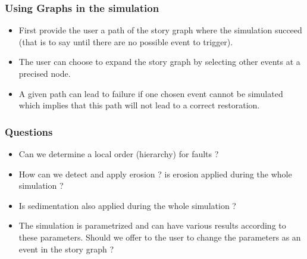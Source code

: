 \documentclass{beamer}
\begin{document}
    \begin{frame}
    \frametitle{Using Graphs in the simulation}
    \begin{itemize}
    \item First provide the user a path of the story graph where the simulation succeed (that is to say until there are no possible event to trigger).
    \item The user can choose to expand the story graph by selecting other events at a precised node. 
    \item A given path can lead to failure if one chosen event cannot be simulated which implies that this path will not lead to a correct restoration.
    \end{itemize}
	\end{frame}
	
	\begin{frame}
	\frametitle{Questions}
	\begin{itemize}
	\item Can we determine a local order (hierarchy) for faults ? 
	\item How can we detect and apply erosion ? is erosion applied during the whole simulation ?
	\item Is sedimentation also applied during the whole simulation ?
	\item The simulation is parametrized and can have various results according to these parameters. Should we offer to the user to change the parameters as an event in the story graph ? 
	\end{itemize}
	\end{frame}
	
\end{document}
